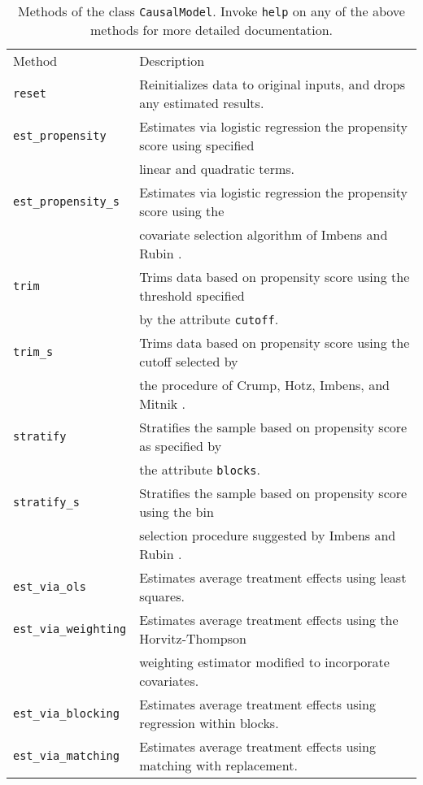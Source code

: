 \documentclass[12pt]{article}
\theoremstyle{definition}
\theoremstyle{definition}
\theoremstyle{definition}
\theoremstyle{remark}
\begin{document}
\begin{table}[ht]
\begin{center}\begin{tabular}{ll}
Method & Description \\
\texttt{reset} & Reinitializes data to original inputs, and drops any estimated results. \\
\texttt{est\_propensity} & Estimates via logistic regression the propensity score using specified \\
& linear and quadratic terms. \\
\texttt{est\_propensity\_s} & Estimates via logistic regression the propensity score using the \\
& covariate selection algorithm of Imbens and Rubin \citeyear{ImbensRubin.2015}. \\
\texttt{trim} & Trims data based on propensity score using the threshold specified \\
& by the attribute \texttt{cutoff}. \\
\texttt{trim\_s} & Trims data based on propensity score using the cutoff selected by \\
& the procedure of Crump, Hotz, Imbens, and Mitnik \citeyear{CrumpHotzImbensMitnik.2009}. \\
\texttt{stratify} & Stratifies the sample based on propensity score as specified by \\
& the attribute \texttt{blocks}. \\
\texttt{stratify\_s} & Stratifies the sample based on propensity score using the bin \\
& selection procedure suggested by Imbens and Rubin \citeyear{ImbensRubin.2015}. \\
\texttt{est\_via\_ols} & Estimates average treatment effects using least squares. \\
\texttt{est\_via\_weighting} & Estimates average treatment effects using the Horvitz-Thompson \\
& weighting estimator modified to incorporate covariates. \\
\texttt{est\_via\_blocking} & Estimates average treatment effects using regression within blocks. \\
\texttt{est\_via\_matching} & Estimates average treatment effects using matching with replacement.
\end{tabular}\end{center}
\caption{Methods of the class \texttt{CausalModel}. Invoke \texttt{help} on any of the above methods for more detailed documentation.}  \label{tab.b}
\end{table}

\clearpage

\end{document}
